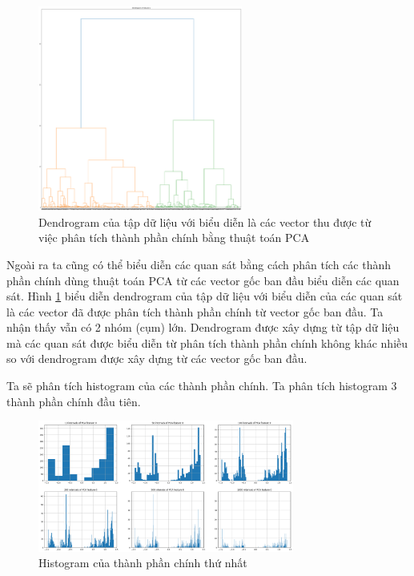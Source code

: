 \begin{figure}[H]
    \centering
    \includegraphics[width=0.6\textwidth]{figures/Thanh/Data_Analysis/With_null_dendrogram_PCA_features.png}
    \caption{Dendrogram của tập dữ liệu với biểu diễn là các vector thu được từ việc phân tích thành phần chính bằng thuật toán PCA}
    \label{fig:With_null_dendrogram_PCA_features}
\end{figure}

Ngoài ra ta cũng có thể biểu diễn các quan sát bằng cách phân tích các thành phần chính dùng thuật toán PCA từ các vector gốc ban đầu biểu diễn các quan sát.
Hình \ref{fig:With_null_dendrogram_PCA_features} biểu diễn dendrogram của tập dữ liệu với biểu diễn của các quan sát là các vector đã được phân tích thành phần chính từ vector gốc ban đầu.
Ta nhận thấy vẫn có 2 nhóm (cụm) lớn. Dendrogram được xây dựng từ tập dữ liệu mà các quan sát được biểu diễn từ phân tích thành phần chính không khác nhiều so với dendrogram được xây dựng từ các vector gốc ban đầu.

Ta sẽ phân tích histogram của các thành phần chính.
Ta phân tích histogram 3 thành phần chính đầu tiên.

\begin{figure}[H]
    \centering
    \includegraphics[width=0.75\textwidth]{figures/Thanh/Data_Analysis/With_null_histogram_PCA_feature_0.png}
    \caption{Histogram của thành phần chính thứ nhất}
    \label{fig:With_null_histogram_PCA_feature_0}
\end{figure}

